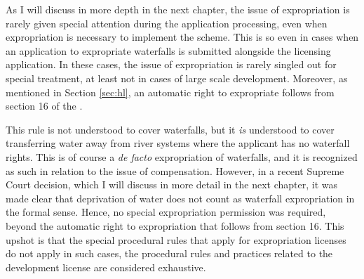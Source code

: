 %

As I will discuss in more depth in the next chapter, the issue of expropriation is rarely given special attention during the application processing, even when expropriation is necessary to implement the scheme. This is so even in cases when an application to expropriate waterfalls is submitted alongside the licensing application. In these cases, the issue of expropriation is rarely singled out for special treatment, at least not in cases of large scale development. Moreover, as mentioned in Section \ref{sec:hl}, an automatic right to expropriate follows from section 16 of the \cite{wra17}. 

This rule is not understood to cover waterfalls, but it {\it is} understood to cover transferring water away from river systems where the applicant has no waterfall rights. This is of course a {\it de facto} expropriation of waterfalls, and it is recognized as such in relation to the issue of compensation. However, in a recent Supreme Court decision, which I will discuss in more detail in the next chapter, it was made clear that deprivation of water does not count as waterfall expropriation in the formal sense. Hence, no special expropriation permission was required, beyond the automatic right to expropriation that follows from section 16. This upshot is that the special procedural rules that apply for expropriation licenses do not apply in such cases, the procedural rules and practices related to the development license are considered exhaustive.

